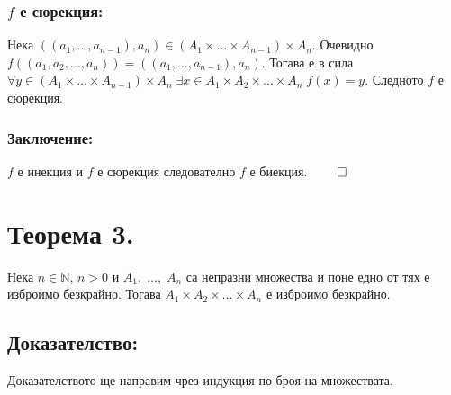 \documentclass[a4paper, 12pt, oneside]{article}
\newcommand{\N}{\mathbb{N}}
\begin{document}
\subsubsection*{\(f\) е сюрекция:}
Нека \(((a_1, \dots, a_{n - 1}), a_n) \in (A_1 \times \dots \times A_{n - 1}) \times A_n\).
Очевидно \(f((a_1, a_2, \dots, a_n)) = ((a_1, \dots, a_{n - 1}), a_n)\). Тогава е в сила \\
\(\forall y \in (A_1 \times \dots \times A_{n - 1}) \times A_n \; \exists x \in A_1 \times A_2 \times \dots \times A_n \; f(x) = y\).
Следното \(f\) е сюрекция.
\subsubsection*{Заключение:}
\(f\) е инекция и \(f\) е сюрекция следователно \(f\) е биекция. \(\qed\)
\section*{Теорема 3.}
Нека \(n \in \N\), \(n > 0\) и \(A_1, \; \dots, \; A_n\)
са непразни множества и поне едно от тях е изброимо безкрайно.
Тогава \(A_1 \times A_2 \times \dots \times A_n\) е изброимо безкрайно.
\subsection*{Доказателство:}
Доказателството ще направим чрез индукция по броя на множествата.
\end{document}
